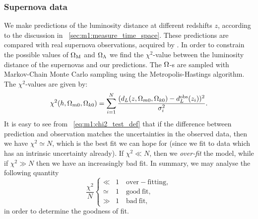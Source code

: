 \subsubsection{Supernova data}
    We make predictions of the luminosity distance at different redshifts $z$, according to the discussion in ~\cref{sec:m1:measure_time_space}. These predictions are compared with real supernova observations, acquired by \cite{Betoule_2014}. In order to constrain the possible values of $\Omega_\mathrm{M}$ and $\Omega_\Lambda$ we find the $\chi^2$-value between the luminosity distance of the supernovas and our predictions. The $\Omega$-s are sampled with Markov-Chain Monte Carlo sampling using the Metropolis-Hastings algorithm. The $\chi^2$-values are given by:
    \begin{equation}\label{eq:m1:chi2_test_def}
        \chi^2(h, \Omega_{m0}, \Omega_{k0}) = \sum_{i=1}^N \frac{(d_L(z, \Omega_{m0}, \Omega_{k0}) - d_L^\mathrm{obs}(z_i))^2}{\sigma_i^2}.
    \end{equation}
    It is easy to see from ~\cref{eq:m1:chi2_test_def} that if the difference between prediction and observation matches the uncertainties in the observed data, then we have $\chi^2 \simeq N$, which is the best fit we can hope for (since we fit to data which has an intrinsic uncertainty already). If $\chi^2\ll N$, then we \textit{over-fit} the model, while if $\chi^2\gg N$ then we have an increasingly bad fit. In summary, we may analyse the following quantity
    \begin{equation}\label{eq:m1:goodness_of_fit}
        \frac{\chi^2}{N} \begin{cases}
            \ll &1 \quad \mathrm{over-fitting,} \\
            \simeq &1 \quad \mathrm{good\ fit,}\\
            \gg &1 \quad \mathrm{bad\ fit,}
        \end{cases}
    \end{equation}
    in order to determine the goodness of fit. 


    